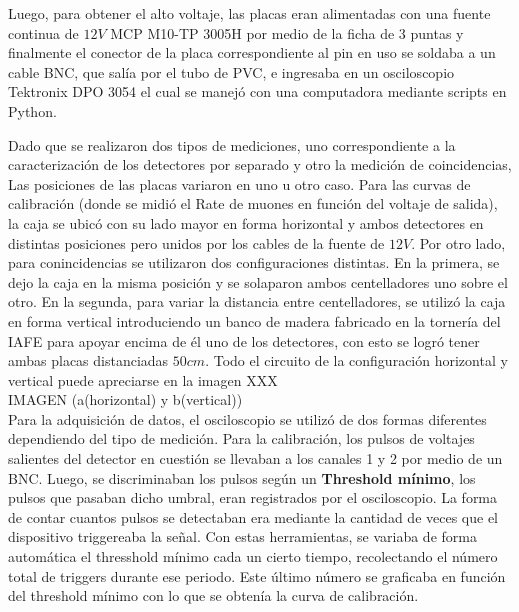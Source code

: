 \documentclass[12pt,a4paper]{article}
\numberwithin{equation}{section}
\begin{document}
Luego, para obtener el alto voltaje, las placas eran alimentadas con una fuente continua de $ 12V $ MCP M10-TP 3005H por medio de la ficha de 3 puntas y finalmente el conector de la placa correspondiente al pin en uso se soldaba a un cable BNC, que salía por el tubo de PVC, e ingresaba en un osciloscopio Tektronix DPO 3054 el cual se manejó con una computadora mediante scripts en Python. 

Dado que se realizaron dos tipos de mediciones, uno correspondiente a la caracterización de los detectores por separado y otro la medición de coincidencias, Las posiciones de las placas variaron en uno u otro caso. Para las curvas de calibración (donde se midió el Rate de muones en función del voltaje de salida), la caja se ubicó con su lado mayor en forma horizontal y ambos detectores en distintas posiciones pero unidos por los cables de la fuente de $ 12V $. Por otro lado, para conincidencias se utilizaron dos configuraciones distintas. En la primera, se dejo la caja en la misma posición y se solaparon ambos centelladores uno sobre el otro. En la segunda, para variar la distancia entre centelladores, se utilizó la caja en forma vertical introduciendo un banco de madera fabricado en la tornería del IAFE para apoyar encima de él uno de los detectores, con esto se logró tener ambas placas distanciadas $ 50 cm $. Todo el circuito de la configuración horizontal y vertical puede apreciarse en la imagen XXX\\

IMAGEN (a(horizontal) y b(vertical))\\

Para la adquisición de datos, el osciloscopio se utilizó de dos formas diferentes dependiendo del tipo de medición. Para la calibración, los pulsos de voltajes salientes del detector en cuestión se llevaban a los canales 1 y 2 por medio de un BNC. Luego, se discriminaban los pulsos según un \textbf{Threshold mínimo}, los pulsos que pasaban dicho umbral, eran registrados por el osciloscopio. La forma de contar cuantos pulsos se detectaban era mediante la cantidad de veces que el dispositivo triggereaba la señal. Con estas herramientas, se variaba de forma automática el thresshold mínimo cada un cierto tiempo, recolectando el número total de triggers durante ese periodo. Este último número se graficaba en función del threshold mínimo con lo que se obtenía la curva de calibración. 
\end{document}
